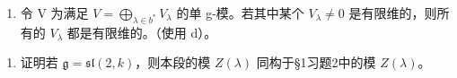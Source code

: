 \begin{enumerate}
\def\labelenumi{\alph{enumi})}
\setcounter{enumi}{4}
\tightlist
\item
  令 V 为满足 \(V = \bigoplus_{\lambda \in b^{*}} V_{\lambda}\) 的单 g-模。若其中某个 \(V_{\lambda} \neq 0\) 是有限维的，则所有的 \(V_{\lambda}\) 都是有限维的。（使用 d）。
\end{enumerate}

\begin{enumerate}
\def\labelenumi{\arabic{enumi})}
\setcounter{enumi}{4}
\tightlist
  \item
  证明若 \(\mathfrak{g} = \mathfrak{sl}(2,k)\)，则本段的模 \(Z(\lambda)\) 同构于§1习题2中的模 \(Z(\lambda)\)。
\end{enumerate}

